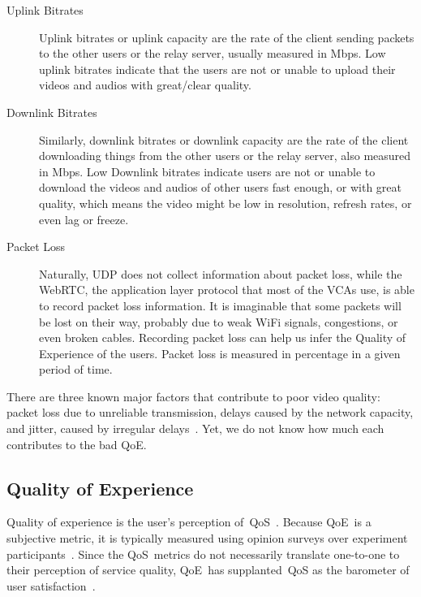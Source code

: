         \begin{description}
            \item[Uplink Bitrates] Uplink bitrates or uplink capacity are the rate of the client sending packets to the other users or the relay server, usually measured in Mbps. Low uplink bitrates indicate that the users are not or unable to upload their videos and audios with great/clear quality. 

            \item[Downlink Bitrates] Similarly, downlink bitrates or downlink capacity are the rate of the client downloading things from the other users or the relay server, also measured in Mbps. Low Downlink bitrates indicate users are not or unable to download the videos and audios of other users fast enough, or with great quality, which means the video might be low in resolution, refresh rates, or even lag or freeze.

            \item[Packet Loss] Naturally, UDP does not collect information about packet loss, while the WebRTC, the application layer protocol that most of the VCAs use, is able to record packet loss information. It is imaginable that some packets will be lost on their way, probably due to weak WiFi signals, congestions, or even broken cables. Recording packet loss can help us infer the Quality of Experience of the users. Packet loss is measured in percentage in a given period of time.
        \end{description}

        There are three known major factors that contribute to poor video quality: packet loss due to unreliable transmission, delays caused by the network capacity, and jitter, caused by irregular delays~\autocite{ChenYanjiao2015FQtQ}. Yet, we do not know how much each contributes to the bad QoE. 

    \subsection{Quality of Experience}\label{introduction:qoe}
        Quality of experience is the user's perception of~QoS~\autocite{ChenYanjiao2015FQtQ}. Because QoE~is a subjective metric, it is typically measured using opinion surveys over experiment participants~\autocite{ChenYanjiao2015FQtQ,RodrriguezDemóstenesZ2014Vqai}. Since the QoS~metrics do not necessarily translate one-to-one to their perception of service quality, QoE~has supplanted~QoS as the barometer of user satisfaction~\autocite{DinakiHosseinEbrahimi2021FVQW}.

